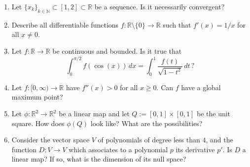 \begin{exercise}
\label{ex:analysis1_recap}
\begin{enumerate}[label=\textbf{(\alph*)}]
  \item Let $\{x_k\}_{k \in \mathbb{N}} \subset [1,2] \subset \mathbb{R}$ be a sequence. Is it
    necessarily convergent?
  \item Describe all differentiable functions $f : \mathbb{R} \setminus \{0\} \to \mathbb{R}$ such
    that $f'(x) = 1/x$ for all $x \neq 0$.
  \item Let $f : \mathbb{R} \to \mathbb{R}$ be continuous and bounded. Is it true that
    \[
      \int_0^{\pi/2} f(\cos(x))\,dx = \int_0^1 \frac{f(t)}{\sqrt{1-t^2}}\,dt \, ?
    \]
  \item Let $f : [0,\infty) \to \mathbb{R}$ have $f''(x) > 0$ for all $x \geq 0$. Can $f$ have a
    global maximum point?
  \item Let $\phi : \mathbb{R}^2 \to \mathbb{R}^2$ be a linear map and let
    $Q := [0,1] \times [0,1]$ be the unit square. How does $\phi(Q)$ look like? What are the
    possibilities?
  \item Consider the vector space $V$ of polynomials of degree less than $4$, and the function
    $D : V \to V$ which associates to a polynomial $p$ its derivative $p'$. Is $D$ a linear map?
    If so, what is the dimension of its null space?
\end{enumerate}
\end{exercise}
